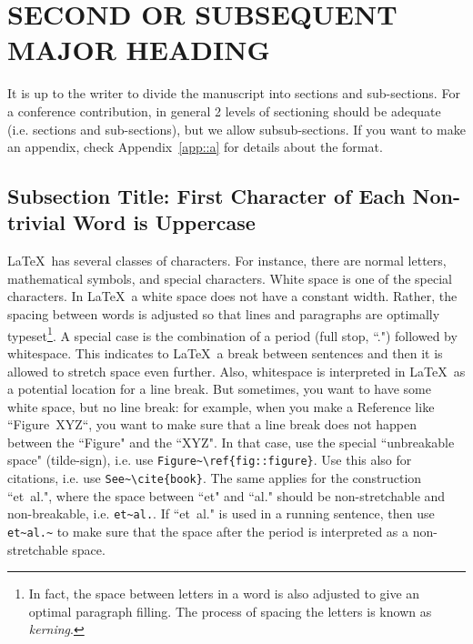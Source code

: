 \documentclass[12pt]{article}
\begin{document}
%
\section{SECOND OR SUBSEQUENT MAJOR HEADING}
\label{sect::second}

It is up to the writer to divide the manuscript into sections and sub-sections. For a conference contribution, in general 2 levels of sectioning should be adequate (i.e. sections and sub-sections), but we allow subsub-sections. If you want to make an appendix, check Appendix~\ref{app::a} for details about the format.

%
\subsection{Subsection Title: First Character of Each Non-trivial Word is Uppercase}
\label{subsect::major}

\LaTeX\ has several classes of characters. For instance, there are normal letters, mathematical symbols, and special characters. White space is one of the special characters. In \LaTeX\, a white space does not have a constant width. Rather, the spacing between words is adjusted so that lines and paragraphs are optimally typeset\footnote{In fact, the space between letters in a word is also adjusted to give an optimal paragraph filling. The process of spacing the letters is known as \emph{kerning}.}. A special case is the combination of a period (full stop, ``.") followed by whitespace. This indicates to \LaTeX\ a break between sentences and then it is allowed to stretch space even further. Also, whitespace is interpreted in \LaTeX\ as a potential location for a line break. But sometimes, you want to have some white space, but no line break: for example, when you make a Reference like ``Figure~XYZ``, you want to make sure that a line break does not happen between the ``Figure" and the ``XYZ". In that case, use the special ``unbreakable space" (tilde-sign), i.e. use \verb|Figure~\ref{fig::figure}|. Use this also for citations, i.e. use \verb|See~\cite{book}|. The same applies for the construction ``et~al.", where the space between ``et" and ``al." should be non-stretchable and non-breakable, i.e. \verb|et~al.|. If ``et~al." is used in a running sentence, then use \verb|et~al.~| to make sure that the space after the period is interpreted as a non-stretchable space.
\end{document}

